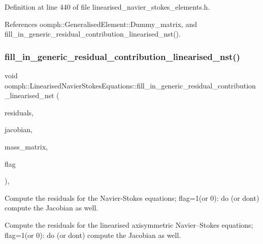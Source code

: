 Definition at line 440 of file linearised\+\_\+navier\+\_\+stokes\+\_\+elements.\+h.



References oomph\+::\+Generalised\+Element\+::\+Dummy\+\_\+matrix, and fill\+\_\+in\+\_\+generic\+\_\+residual\+\_\+contribution\+\_\+linearised\+\_\+nst().

\mbox{\label{classoomph_1_1LinearisedNavierStokesEquations_a9f6b557aa6599c067c042bc076a3bf8d}} 
\subsubsection{\texorpdfstring{fill\+\_\+in\+\_\+generic\+\_\+residual\+\_\+contribution\+\_\+linearised\+\_\+nst()}{fill\_in\_generic\_residual\_contribution\_linearised\_nst()}}
{\footnotesize\ttfamily void oomph\+::\+Linearised\+Navier\+Stokes\+Equations\+::fill\+\_\+in\+\_\+generic\+\_\+residual\+\_\+contribution\+\_\+linearised\+\_\+nst (\begin{DoxyParamCaption}\item[{\hyperlink{classoomph_1_1Vector}{Vector}$<$ double $>$ \&}]{residuals,  }\item[{\hyperlink{classoomph_1_1DenseMatrix}{Dense\+Matrix}$<$ double $>$ \&}]{jacobian,  }\item[{\hyperlink{classoomph_1_1DenseMatrix}{Dense\+Matrix}$<$ double $>$ \&}]{mass\+\_\+matrix,  }\item[{unsigned}]{flag }\end{DoxyParamCaption})\hspace{0.3cm}{\ttfamily [protected]}, {\ttfamily [virtual]}}



Compute the residuals for the Navier-\/\+Stokes equations; flag=1(or 0)\+: do (or don\textquotesingle{}t) compute the Jacobian as well. 

Compute the residuals for the linearised axisymmetric Navier--Stokes equations; flag=1(or 0)\+: do (or don\textquotesingle{}t) compute the Jacobian as well. 

